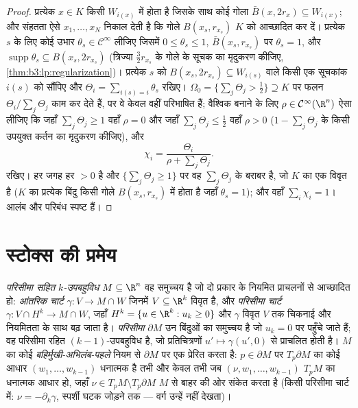 \begin{proof}
प्रत्येक $x \in K$ किसी $W_{i(x)}$ में होता है जिसके साथ कोई  गोला
$\bar B(x, 2r_x) \subseteq W_{i(x)}$; और संहतता ऐसे $x_1, \dots, x_N$ निकाल देती है कि गोले $B(x_s, r_{x_s})$ $K$ को
आच्छादित कर दें। प्रत्येक $s$ के लिए कोई उभार $\theta_s \in \mathcal
C^\infty$ लीजिए
जिसमें $0 \leq \theta_s \leq 1$, $\bar B(x_s, r_{x_s})$ पर $\theta_s = 1$, और $\operatorname{supp}\theta_s
\subseteq B(x_s, 2r_{x_s})$ (त्रिज्या $\frac32r_{x_s}$ के गोले
के सूचक का मृदुकरण कीजिए, \cref{thm:b3:lp:regularization})। प्रत्येक $s$ को $B(x_s, 2r_{x_s}) \subseteq W_{i(s)}$ वाले
किसी एक सूचकांक $i(s)$ को सौंपिए और $\Theta_i = \sum_{i(s) = i}\theta_s$ रखिए। 
$\Omega_0 = \{\sum_j\Theta_j > \tfrac12\} \supseteq K$ पर फलन $\Theta_i/\sum_j\Theta_j$ काम कर देते हैं, पर वे केवल वहीं परिभाषित हैं;
वैश्विक बनाने के लिए $\rho \in \mathcal
C^\infty(\R^n)$ ऐसा लीजिए कि जहाँ $\sum_j\Theta_j
\geq 1$ वहाँ $\rho = 0$ और
जहाँ $\sum_j\Theta_j \leq \tfrac12$ वहाँ $\rho > 0$ ($1 - \sum_j\Theta_j$ के किसी उपयुक्त कर्तन का मृदुकरण
कीजिए), और
\[
\chi_i = \frac{\Theta_i}{\rho + \sum_j\Theta_j} .
\]
रखिए। हर जगह हर $> 0$ है और $\{\sum_j\Theta_j \geq 1\}$ पर वह $\sum_j\Theta_j$ के बराबर है, जो
$K$ का एक विवृत  है ($K$ का प्रत्येक बिंदु किसी गोले
$B(x_s, r_{x_s})$ में होता है जहाँ $\theta_s = 1$); और वहाँ $\sum_i\chi_i = 1$। आलंब और परिबंध
स्पष्ट हैं।
\end{proof}

\section{स्टोक्स की प्रमेय}

\begin{definition}\label{def:b3:forms:boundary}
\emph{परिसीमा सहित $k$-उपबहुविध}
$M \subseteq \R^n$ वह समुच्चय है जो दो प्रकार के नियमित प्राचलनों से आच्छादित
हो: \emph{आंतरिक चार्ट} $\gamma\colon V \to M \cap W$ जिनमें $V \subseteq \R^k$ विवृत है, और
\emph{परिसीमा चार्ट} $\gamma\colon V \cap H^k \to M
\cap W$, जहाँ $H^k = \{u \in \R^k : u_k \geq 0\}$ और $\gamma$ विवृत $V$ तक
चिकनाई और नियमितता के साथ बढ़ जाता है। \emph{परिसीमा} $\partial M$ उन
बिंदुओं का समुच्चय है जो $u_k = 0$ पर पहुँचे जाते हैं; वह परिसीमा
रहित $(k-1)$-उपबहुविध है, जो प्रतिचित्रणों $u' \mapsto \gamma(u',
0)$ से प्राचलित होती
है। $M$ का कोई  \emph{बहिर्मुखी-अभिलंब-पहले} नियम से
$\partial M$ पर एक  प्रेरित करता है: $p \in \partial M$ पर $T_p\partial M$ का कोई
आधार $(w_1, \dots, w_{k-1})$ धनात्मक है तभी और केवल तभी जब $(\nu, w_1, \dots, w_{k-1})$ $T_pM$ का धनात्मक
आधार हो, जहाँ $\nu \in T_pM \setminus T_p\partial M$ $M$ से बाहर की ओर संकेत करता है (किसी
परिसीमा चार्ट में: $\nu =
-\partial_k\gamma$, स्पर्शी घटक जोड़ने तक --- 
वर्ग उन्हें नहीं देखता)।
\end{definition}

